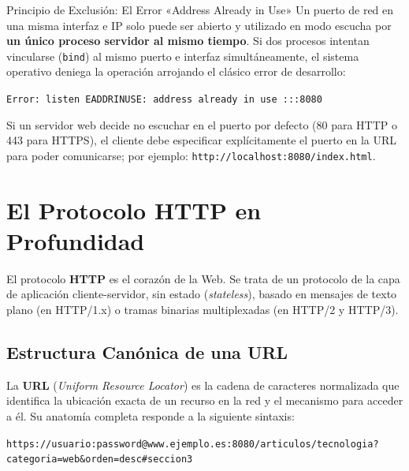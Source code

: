 \begin{importante}{Principio de Exclusión: El Error «Address Already in Use»}
Un puerto de red en una misma interfaz e IP solo puede ser abierto y utilizado en modo escucha por \textbf{un único proceso servidor al mismo tiempo}. Si dos procesos intentan vincularse (\texttt{bind}) al mismo puerto e interfaz simultáneamente, el sistema operativo deniega la operación arrojando el clásico error de desarrollo:
\begin{center}
  \texttt{Error: listen EADDRINUSE: address already in use :::8080}
\end{center}
Si un servidor web decide no escuchar en el puerto por defecto (80 para HTTP o 443 para HTTPS), el cliente debe especificar explícitamente el puerto en la URL para poder comunicarse; por ejemplo: \texttt{http://localhost:8080/index.html}.
\end{importante}
\section{El Protocolo HTTP en Profundidad}

El protocolo \textbf{HTTP} es el corazón de la Web. Se trata de un protocolo de la capa de aplicación cliente-servidor, sin estado (\textit{stateless}), basado en mensajes de texto plano (en HTTP/1.x) o tramas binarias multiplexadas (en HTTP/2 y HTTP/3).

\subsection{Estructura Canónica de una URL}

La \textbf{URL} (\textit{Uniform Resource Locator}) es la cadena de caracteres normalizada que identifica la ubicación exacta de un recurso en la red y el mecanismo para acceder a él. Su anatomía completa responde a la siguiente sintaxis:

\begin{center}
\texttt{\textcolor{primary}{https}://\textcolor{secondary}{usuario:password@}\textcolor{primary}{www.ejemplo.es}:\textcolor{accent}{8080}/\textcolor{strgreen}{articulos/tecnologia}?\textcolor{kwpurple}{categoria=web\&orden=desc}\#\textcolor{alertred}{seccion3}}
\end{center}

